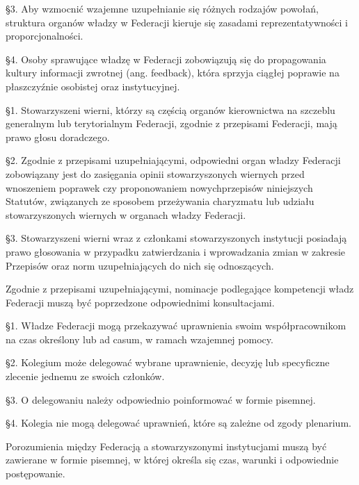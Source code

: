 \S{}3. Aby wzmocnić wzajemne uzupełnianie się różnych rodzajów powołań, struktura organów władzy w Federacji kieruje się zasadami reprezentatywności i proporcjonalności.


\S{}4. Osoby sprawujące władzę w Federacji zobowiązują się do propagowania kultury informacji zwrotnej (ang. feedback), która sprzyja ciągłej poprawie na płaszczyźnie osobistej oraz instytucyjnej.
 




 \S{}1. Stowarzyszeni wierni, którzy są częścią organów kierownictwa na szczeblu generalnym lub terytorialnym Federacji, zgodnie z przepisami Federacji, mają prawo głosu doradczego.


\S{}2. Zgodnie z przepisami uzupełniającymi, odpowiedni organ władzy Federacji zobowiązany jest do zasięgania opinii stowarzyszonych wiernych przed wnoszeniem poprawek czy proponowaniem nowychprzepisów niniejszych Statutów, związanych ze sposobem przeżywania charyzmatu lub udziału stowarzyszonych wiernych w organach władzy Federacji.


\S{}3. Stowarzyszeni wierni wraz z członkami stowarzyszonych instytucji posiadają prawo głosowania w przypadku zatwierdzania i wprowadzania zmian w zakresie Przepisów oraz norm uzupełniających do nich się odnoszących.
 


 Zgodnie z przepisami uzupełniającymi, nominacje podlegające kompetencji władz Federacji muszą być poprzedzone odpowiednimi konsultacjami.
 


 \S{}1. Władze Federacji mogą przekazywać uprawnienia swoim współpracownikom na czas określony lub ad casum, w ramach wzajemnej pomocy.


\S{}2. Kolegium może delegować wybrane uprawnienie, decyzję lub specyficzne zlecenie jednemu ze swoich członków.


\S{}3. O delegowaniu należy odpowiednio poinformować w formie pisemnej.


\S{}4. Kolegia nie mogą delegować uprawnień, które są zależne od zgody plenarium.
 


 Porozumienia między Federacją a stowarzyszonymi instytucjami muszą być zawierane w formie pisemnej, w której określa się czas, warunki i odpowiednie postępowanie.
 
